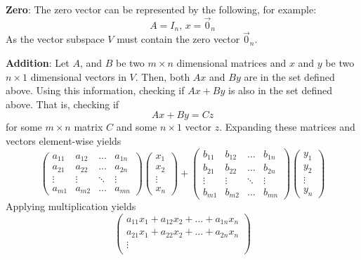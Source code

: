 \documentclass{article}
\begin{document}
\begin{enumerate}
    \bigbreak

    {\bf Zero}: The zero vector can be represented by the following, for example:
    $$ A = I_n,\, x = \vec{0}_n $$
    As the vector subspace $ V $ must contain the zero vector $ \vec{0}_n $.
    
    \bigbreak

    {\bf Addition}: Let $ A $, and $ B $ be two $ m \times n $ dimensional
    matrices and $ x $ and $ y $ be two $ n \times 1 $ dimensional vectors in
    $ V $. Then, both $ Ax $ and $ By $ are in the set defined above. Using
    this information, checking if $ Ax + By $ is also in the set defined
    above. That is, checking if
    $$ Ax + By = Cz $$
    for some $ m \times n $ matrix $ C $ and some $ n \times 1 $ vector $ z $.
    Expanding these matrices and vectors element-wise yields
    $$ \begin{pmatrix}
        a_{11} & a_{12} & \ldots & a_{1n} \\
        a_{21} & a_{22} & \ldots & a_{2n} \\
        \vdots & \vdots & \ddots & \vdots \\
        a_{m1} & a_{m2} & \ldots & a_{mn}
    \end{pmatrix}
    \begin{pmatrix}
        x_1 \\
        x_2 \\
        \vdots \\
        x_n 
    \end{pmatrix}
    +
    \begin{pmatrix}
        b_{11} & b_{12} & \ldots & b_{1n} \\
        b_{21} & b_{22} & \ldots & b_{2n} \\
        \vdots & \vdots & \ddots & \vdots \\
        b_{m1} & b_{m2} & \ldots & b_{mn}
    \end{pmatrix}
    \begin{pmatrix}
        y_1 \\
        y_2 \\
        \vdots \\
        y_n 
    \end{pmatrix} $$
    Applying multiplication yields
    $$ \begin{pmatrix}
        a_{11} x_1 + a_{12} x_2 + \ldots + a_{1n} x_n \\
        a_{21} x_1 + a_{22} x_2 + \ldots + a_{2n} x_n \\
        \vdots \\

\end{pmatrix}$$
\end{enumerate}
\end{document}
